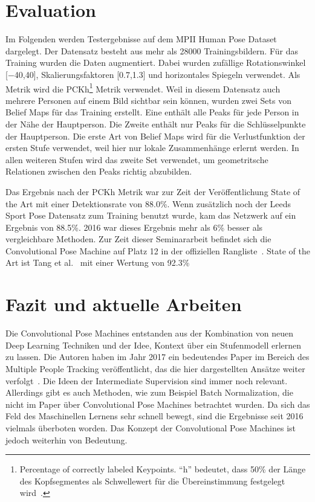 \documentclass[journal, a4paper]{IEEEtran}
\begin{document}
\section{Evaluation}

        Im Folgenden werden Testergebnisse auf dem MPII Human Pose Dataset~\cite{MPII} dargelegt. Der Datensatz besteht aus mehr als 28000 Trainingsbildern. Für das Training wurden die Daten augmentiert. Dabei wurden zufällige Rotationswinkel [$-$40\degree,40\degree], Skalierungsfaktoren [0.7,1.3] und horizontales Spiegeln verwendet. Als Metrik wird die PCKh\footnote{Percentage of correctly labeled Keypoints. "`h"' bedeutet, dass 50\% der Länge des Kopfsegmentes als Schwellewert für die Übereinstimmung festgelegt wird~\cite{MPII}.} Metrik verwendet. 
        Weil in diesem Datensatz auch mehrere Personen auf einem Bild sichtbar sein können, wurden zwei Sets von Belief Maps für das Training erstellt. Eine enthält alle Peaks für jede Person in der Nähe der Hauptperson. Die Zweite enthält nur Peaks für die Schlüsselpunkte der Hauptperson.
        Die erste Art von Belief Maps wird für die Verlustfunktion der ersten Stufe verwendet, weil hier nur lokale Zusammenhänge erlernt werden. In allen weiteren Stufen wird das zweite Set verwendet, um geometritsche Relationen zwischen den Peaks richtig abzubilden.

        Das Ergebnis nach der PCKh Metrik war zur Zeit der Veröffentlichung State of the Art mit einer Detektionsrate von 88.0\%. Wenn zusätzlich noch der Leeds Sport Pose Datensatz zum Training benutzt wurde, kam das Netzwerk auf ein Ergebnis von 88.5\%. 2016 war dieses Ergebnis mehr als 6\% besser als vergleichbare Methoden. Zur Zeit dieser Seminararbeit befindet sich die Convolutional Pose Machine auf Platz 12 in der offiziellen Rangliste~\cite{MPII}. State of the Art ist Tang et al.~\cite{tang2018deeply} mit einer Wertung von 92.3\%
        
\section{Fazit und aktuelle Arbeiten}
        Die Convolutional Pose Machines entstanden aus der Kombination von neuen Deep Learning Techniken und der Idee, Kontext über ein Stufenmodell erlernen zu lassen. Die Autoren haben im Jahr 2017 ein bedeutendes Paper im Bereich des Multiple People Tracking veröffentlicht, das die hier dargestellten Ansätze weiter verfolgt~\cite{cao2017realtime}. Die Ideen der Intermediate Supervision sind immer noch relevant. Allerdings gibt es auch Methoden, wie zum Beispiel Batch Normalization, die nicht im Paper über Convolutional Pose Machines betrachtet wurden. Da sich das Feld des Maschinellen Lernens sehr schnell bewegt, sind die Ergebnisse seit 2016 vielmals überboten worden. Das Konzept der Convolutional Pose Machines ist jedoch weiterhin von Bedeutung.



\renewcommand\bibname{Literatur}

\end{document}
